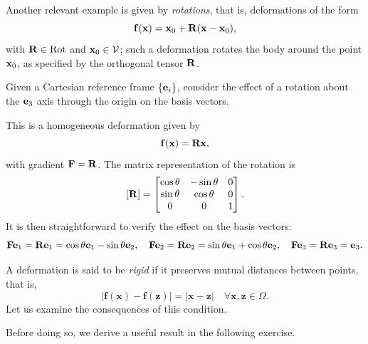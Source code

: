 Another relevant example is given by \textit{rotations}, that is, deformations of the form
\begin{equation}
	\mathbf{f}(\mathbf{x})=\mathbf{x}_0+\mathbf{R}(\mathbf{x}-\mathbf{x}_0),
\end{equation}
with $\mathbf{R}\in\operatorname{Rot}$ and $\mathbf{x}_0\in\mathcal{V}$; such a deformation rotates the body around the point $\mathbf{x}_0$, as specified by the orthogonal tensor $\mathbf{R}$.

\begin{exercise}
	Given a Cartesian reference frame $\{\mathbf{e}_i\}$, consider the effect of a rotation about the $\mathbf{e}_3$ axis through the origin on the basis vectors.
	
	\begin{svolgimento}
		This is a homogeneous deformation given by
		\begin{equation}
			\mathbf{f}(\mathbf{x})=\mathbf{R}\mathbf{x},
		\end{equation}
		with gradient $\mathbf{F}=\mathbf{R}$. The matrix representation of the rotation is
		\begin{equation}\label{Rp}
			[\mathbf{R}]=\begin{bmatrix}\cos\theta&-\sin\theta&0\\\sin\theta&\cos\theta&0\\0&0&1\end{bmatrix}.
		\end{equation}
		It is then straightforward to verify the effect on the basis vectors:
		\begin{equation}
			\mathbf{F}\mathbf{e}_1=\mathbf{R}\mathbf{e}_1=\cos\theta\mathbf{e}_1-\sin\theta\mathbf{e}_2, \quad \mathbf{F}\mathbf{e}_2=\mathbf{R}\mathbf{e}_2=\sin\theta\mathbf{e}_1+\cos\theta\mathbf{e}_2,  \quad 
			\mathbf{F}\mathbf{e}_3=\mathbf{R}\mathbf{e}_3=\mathbf{e}_3.
		\end{equation}
	\end{svolgimento}
\end{exercise}

A deformation is said to be \textit{rigid} if it preserves mutual distances between points, that is,
\begin{equation}\label{fxfz}
	|\mathbf{f}(\mathbf{x})-\mathbf{f}(\mathbf{z})|=|\mathbf{x}-\mathbf{z}|\quad\forall\mathbf{x},\mathbf{z}\in\Omega.
\end{equation}
Let us examine the consequences of this condition.

Before doing so, we derive a useful result in the following exercise.

